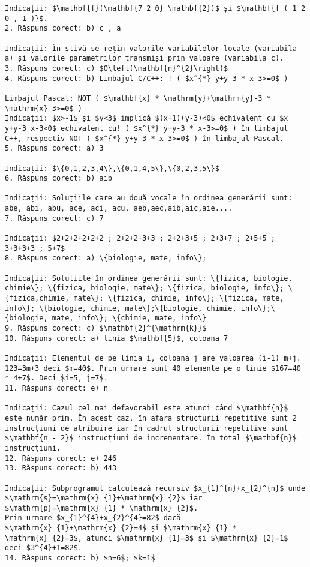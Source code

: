 \begin{verbatim}
Indicații: $\mathbf{f}(\mathbf{7 2 0} \mathbf{2})$ și $\mathbf{f ( 1 2 0 , 1 )}$.
2. Răspuns corect: b) c , a

Indicații: În stivă se rețin valorile variabilelor locale (variabila a) și valorile parametrilor transmiși prin valoare (variabila c).
3. Răspuns corect: c) $O\left(\mathbf{n}^{2}\right)$
4. Răspuns corect: b) Limbajul C/C++: ! ( $x^{*} y+y-3 * x-3>=0$ )

Limbajul Pascal: NOT ( $\mathbf{x} * \mathrm{y}+\mathrm{y}-3 * \mathrm{x}-3>=0$ )
Indicații: $x>-1$ și $y<3$ implică $(x+1)(y-3)<0$ echivalent cu $x y+y-3 x-3<0$ echivalent cu! ( $x^{*} y+y-3 * x-3>=0$ ) în limbajul C++, respectiv NOT ( $x^{*} y+y-3 * x-3>=0$ ) în limbajul Pascal.
5. Răspuns corect: a) 3

Indicații: $\{0,1,2,3,4\},\{0,1,4,5\},\{0,2,3,5\}$
6. Răspuns corect: b) aib

Indicații: Soluțiile care au două vocale în ordinea generării sunt: abe, abi, abu, ace, aci, acu, aeb,aec,aib,aic,aie....
7. Răspuns corect: c) 7

Indicații: $2+2+2+2+2+2 ; 2+2+2+3+3 ; 2+2+3+5 ; 2+3+7 ; 2+5+5 ; 3+3+3+3 ; 5+7$
8. Răspuns corect: a) \{biologie, mate, info\};

Indicații: Solutiile în ordinea generării sunt: \{fizica, biologie, chimie\}; \{fizica, biologie, mate\}; \{fizica, biologie, info\}; \{fizica,chimie, mate\}; \{fizica, chimie, info\}; \{fizica, mate, info\}; \{biologie, chimie, mate\};\{biologie, chimie, info\};\{biologie, mate, info\}; \{chimie, mate, info\}
9. Răspuns corect: c) $\mathbf{2}^{\mathrm{k}}$
10. Răspuns corect: a) linia $\mathbf{5}$, coloana 7

Indicații: Elementul de pe linia i, coloana j are valoarea (i-1) m+j. 123=3m+3 deci $m=40$. Prin urmare sunt 40 elemente pe o linie $167=40 * 4+7$. Deci $i=5, j=7$.
11. Răspuns corect: e) n

Indicații: Cazul cel mai defavorabil este atunci când $\mathbf{n}$ este număr prim. În acest caz, în afara structurii repetitive sunt 2 instrucțiuni de atribuire iar în cadrul structurii repetitive sunt $\mathbf{n - 2}$ instrucțiuni de incrementare. În total $\mathbf{n}$ instrucțiuni.
12. Răspuns corect: e) 246
13. Răspuns corect: b) 443

Indicații: Subprogramul calculează recursiv $x_{1}^{n}+x_{2}^{n}$ unde $\mathrm{s}=\mathrm{x}_{1}+\mathrm{x}_{2}$ iar $\mathrm{p}=\mathrm{x}_{1} * \mathrm{x}_{2}$.
Prin urmare $x_{1}^{4}+x_{2}^{4}=82$ dacă $\mathrm{x}_{1}+\mathrm{x}_{2}=4$ și $\mathrm{x}_{1} * \mathrm{x}_{2}=3$, atunci $\mathrm{x}_{1}=3$ și $\mathrm{x}_{2}=1$ deci $3^{4}+1=82$.
14. Răspuns corect: b) $n=6$; $k=1$


\end{verbatim}
